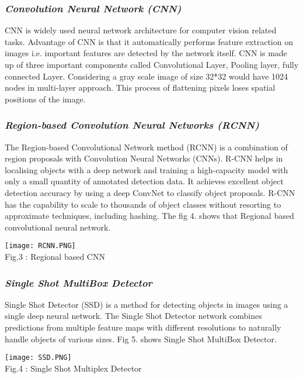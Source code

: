 \documentclass[12pt,a4paper,roman]{article}
\begin{document}
\subsubsection{\textit{Convolution Neural Network (CNN)}}
CNN is widely used neural network architecture for computer vision related tasks. Advantage of CNN is that it automatically performs feature extraction on images i.e. important features are detected by the network itself. CNN is made up of three important components called Convolutional Layer, Pooling layer, fully connected Layer. Considering a gray scale image of size 32*32 would have 1024 nodes in multi-layer approach. This process of flattening pixels loses spatial positions of the image.\\

\subsubsection{\textit{Region-based Convolution Neural Networks (RCNN)}}
The Region-based Convolutional Network method (RCNN) is a combination of region proposals with Convolution Neural Networks (CNNs). R-CNN helps in localising objects with a deep network and training a high-capacity model with only a small quantity of annotated detection data. It achieves excellent object detection accuracy by using a deep ConvNet to classify object proposals. R-CNN has the capability to scale to thousands of object classes without resorting to approximate techniques, including hashing. The fig 4. shows that Regional based convolutional neural network.

\begin{center}
\texttt{[image: RCNN.PNG]} \\
Fig.3 : Regional based CNN
\end{center}

\subsubsection{\textit{Single Shot MultiBox Detector}}
Single Shot Detector (SSD) is a method for detecting objects in images using a single deep neural network. The Single Shot Detector network combines predictions from multiple feature maps with different resolutions to naturally handle objects of various sizes. Fig 5. shows Single Shot MultiBox Detector. 

\begin{center}
\texttt{[image: SSD.PNG]}\\
Fig.4 : Single Shot Multiplex Detector
\end{center}
\end{document}
